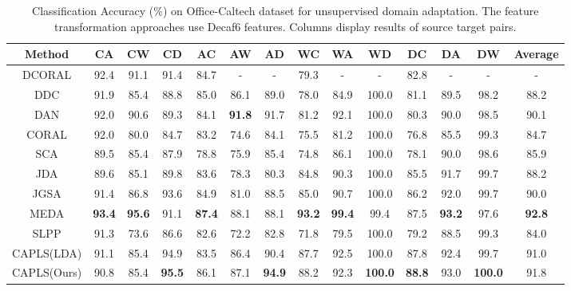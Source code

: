 \documentclass[conference]{IEEEtran}
\begin{document}
\begin{table*}[!htbp]
	\centering
	{\centering
		\caption[]{Classification Accuracy (\%) on Office-Caltech dataset for unsupervised domain adaptation. The feature transformation approaches use Decaf6 features. Columns display results of source  target pairs.\\}
		\label{table:uda_o10}
		\begin{lrbox}{\tablebox}
			\begin{tabular}{cccccccccccccc}
				\hline
				Method & CA & CW & CD & AC&AW & AD&WC & WA & WD & DC & DA & DW & Average \\ \hline
				DCORAL\cite{sun2016deep} & 92.4 & 91.1 & 91.4 & 84.7& - & - & 79.3 & - & - & 82.8 & - & - & -\\
				DDC\cite{tzeng2014deep}  & 91.9 & 85.4 & 88.8 & 85.0 & 86.1 & 89.0 & 78.0 & 84.9 & 100.0 & 81.1 & 89.5 & 98.2 & 88.2\\
				DAN\cite{long2015learning}  & 92.0 & 90.6 & 89.3 & 84.1 & \textbf{91.8} & 91.7 & 81.2 & 92.1 & 100.0 & 80.3 & 90.0 & 98.5 & 90.1\\
				\hline
				CORAL\cite{sun2017correlation}& 92.0 & 80.0 & 84.7 & 83.2 & 74.6 & 84.1 & 75.5 & 81.2 & 100.0 & 76.8 & 85.5 & 99.3 & 84.7\\
				SCA\cite{ghifary2017scatter}  & 89.5 & 85.4 & 87.9 & 78.8 & 75.9 & 85.4 & 74.8 & 86.1 & 100.0 & 78.1 & 90.0 & 98.6 & 85.9 \\
				JDA\cite{long2013transfer}  & 89.6 & 85.1 & 89.8 & 83.6 & 78.3 & 80.3 & 84.8 & 90.3 & 100.0 & 85.5 & 91.7 & 99.7 & 88.2\\
				JGSA\cite{zhang2017joint} & 91.4 & 86.8 & 93.6 & 84.9 & 81.0 & 88.5 & 85.0 & 90.7 & 100.0 & 86.2 & 92.0 & 99.7 & 90.0\\
				MEDA\cite{wang2018visual} & \textbf{93.4} & \textbf{95.6} & 91.1 & \textbf{87.4} & 88.1 & 88.1 & \textbf{93.2} & \textbf{99.4} & 99.4 & 87.5 & \textbf{93.2} & 97.6 & \textbf{92.8}\\
				SLPP & 91.3 & 73.6 & 86.6 & 82.6 & 72.2 & 82.8 & 71.8 & 79.5 & 100.0 & 79.2 & 88.5 & 99.3 & 84.0\\
				CAPLS(LDA) & 91.1 & 85.4 & 94.9 & 83.5 & 86.4 & 90.4 & 87.7 & 92.5 & 100.0 & 87.8 & 92.4 & 99.7 & 91.0\\ \hline
				CAPLS(Ours) & 90.8 & 85.4 & \textbf{95.5} & 86.1 & 87.1 & \textbf{94.9} & 88.2 & 92.3 & \textbf{100.0} & \textbf{88.8} & 93.0 & \textbf{100.0}& 91.8\\
				\hline
				\hline
			\end{tabular}
		\end{lrbox}
		\scalebox{0.85}{\usebox{\tablebox}}
	}
\end{table*}
\end{document}
